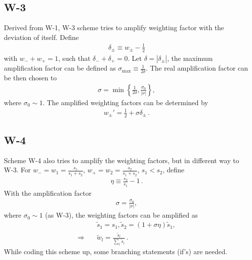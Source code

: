 \documentclass[11pt,dvips]{article}
\numberwithin{equation}{section}
\begin{document}
\subsection{W-3}

Derived from W-1, W-3 scheme tries to amplify weighting factor with the
deviation of itself.
Define
\begin{align}
  \delta_{\pm} \equiv w_{\pm} - \frac{1}{2} \label{e:W3_delta}
\end{align}
with $w_- + w_+ = 1$, such that $\delta_- + \delta_+ = 0$.
Let $\delta = |\delta_{\pm}|$, the maximum amplification factor can be
defined as $\sigma_{\text{max}} \equiv \frac{1}{2\delta}$.
The real amplification factor can be then chosen to
\begin{align}
  \sigma = \min\left\{\frac{1}{2\delta}, \frac{\sigma_0}{|\nu|}\right\},
    \label{e:W3_sigma}
\end{align}
where $\sigma_0\sim1$.
The amplified weighting factors can be determined by
\begin{align}
  w_{\pm}' = \frac{1}{2} + \sigma\delta_{\pm}\,. \label{e:W3_w}
\end{align}
\citep[See also Equations (4.16), (4.30), (4.32), (4.25) in][]%
{chang_multi-dimensional_2003}

\subsection{W-4}

Scheme W-4 also tries to amplify the weighting factors, but in different
way to W-3.
For $w_- = w_1 = \frac{s_1}{s_1+s_2}$, $w_+ = w_2 = \frac{s_2}{s_1+s_2}$,
$s_1<s_2$, define
\begin{align}
  \eta \equiv \frac{s_2}{s_1} - 1\,. \label{e:W4_eta}
\end{align}
With the amplification factor
\begin{align}
  \sigma = \frac{\sigma_0}{|\nu|}, \label{e:W4_sigma}
\end{align}
where $\sigma_0 \sim 1$ (as W-3), the weighting factors can be amplified
as
\begin{align}
  &\tilde{s}_1 = s_1, \tilde{s}_2 = (1+\sigma\eta)\tilde{s}_1,
    \label{e:W4_s} \\
  \Rightarrow\quad &\tilde{w}_l = \frac{\tilde{s}_l}{\sum_i\tilde{s}_i}
    \label{e:W4_w} \,.
\end{align}
While coding this scheme up, some branching statements (if's) are needed.
\citep[See also Equation (4.35), (4.37), (4.38), (4.39), (4.46) in][]%
{chang_multi-dimensional_2003}
\end{document}

